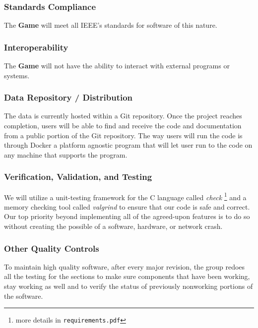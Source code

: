 \documentclass[letterpaper]{article}
\begin{document}
\subsubsection{Standards Compliance}
\label{sec:design_constraints_3}

The \textbf{Game} will meet all IEEE's standards for software of
this nature. 

\subsubsection{Interoperability}
\label{sec:design_constraints_4}

The \textbf{Game} will not have the ability to interact with
external programs or systems.

\subsubsection{Data Repository / Distribution}
\label{sec:design_constraints_5}

The data is currently hosted within a Git repository. Once the
project reaches completion, users will be able to find and
receive the code and documentation from a public portion of the
Git repository. The way users will run the code is through
Docker a platform agnostic program that will let user run to the
code on any machine that supports the program. 

\subsubsection{Verification, Validation, and Testing}
\label{sec:design_constraints_6}

We will utilize a unit-testing framework for the C language
called \emph{check}
\footnote{more details in \texttt{requirements.pdf}} and a
memory checking tool called \emph{valgrind} to ensure that our
code is safe and correct. Our top priority beyond implementing
all of the agreed-upon features is to do so without creating the
possible of a software, hardware, or network crash.

\subsubsection{Other Quality Controls}
\label{sec:design_constraints_7}

To maintain high quality software, after every major revision,
the group redoes all the testing for the sections to make sure
components that have been working, stay working as well and to
verify the status of previously nonworking portions of the
software. 
\end{document}
